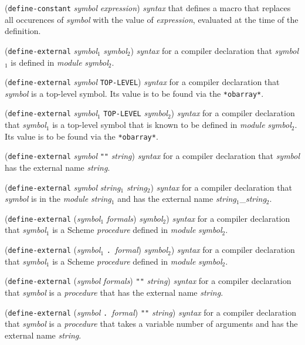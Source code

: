 \documentclass[10pt,twocolumn]{article}
\begin{document}
(\texttt{define-constant} \emph{symbol} \emph{expression}) \emph{syntax} that
defines a macro that replaces all occurences of \emph{symbol} with the
value of \emph{expression}, evaluated at the time of the definition.

(\texttt{define-external} \emph{symbol}$_1$ \emph{symbol}$_2$) \emph{syntax} for
a compiler declaration that \emph{symbol}$_1$ is defined in \emph{module}
\emph{symbol}$_2$.

(\texttt{define-external} \emph{symbol} \texttt{TOP-LEVEL}) \emph{syntax} for a
compiler declaration that \emph{symbol} is a top-level symbol.  Its
value is to be found via the \texttt{*obarray*}.

(\texttt{define-external} \emph{symbol}$_1$ \texttt{TOP-LEVEL} \emph{symbol}$_2$)
\emph{syntax} for a compiler declaration that \emph{symbol}$_1$ is a
top-level symbol that is known to be defined in \emph{module}
\emph{symbol}$_2$.  Its value is to be found via the \texttt{*obarray*}.

(\texttt{define-external} \emph{symbol} \texttt{""} \emph{string}) \emph{syntax} for a
compiler declaration that \emph{symbol} has the external name
\emph{string}.

(\texttt{define-external} \emph{symbol} \emph{string}$_1$ \emph{string}$_2$)
\emph{syntax} for a compiler declaration that \emph{symbol} is in the
\emph{module} \emph{string}$_1$ and has the external name
\emph{string}$_1$\_\emph{string}$_2$.

(\texttt{define-external} (\emph{symbol}$_1$ \emph{formals}) \emph{symbol}$_2$)
\emph{syntax} for a compiler declaration that \emph{symbol}$_1$ is a
Scheme \emph{procedure} defined in \emph{module} \emph{symbol}$_2$.

(\texttt{define-external} (\emph{symbol}$_1$ \texttt{.}\ \emph{formal})
\emph{symbol}$_2$) \emph{syntax} for a compiler declaration that
\emph{symbol}$_1$ is a Scheme \emph{procedure} defined in \emph{module}
\emph{symbol}$_2$.

(\texttt{define-external} (\emph{symbol} \emph{formals}) \texttt{""} \emph{string})
\emph{syntax} for a compiler declaration that \emph{symbol} is a
\emph{procedure} that has the external name \emph{string}.

(\texttt{define-external} (\emph{symbol} \texttt{.}\ \emph{formal}) \texttt{""} \emph{string})
\emph{syntax} for a compiler declaration that \emph{symbol} is a
\emph{procedure} that takes a variable number of arguments and has the
external name \emph{string}.
\end{document}
